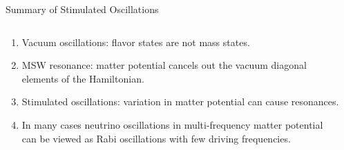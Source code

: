 \documentclass[9pt]{beamer}
\begin{document}
\begin{darkframes}
\begin{frame}{Summary of Stimulated Oscillations}


\begin{columns}[T]
\begin{column}{0.6\textwidth}

\begin{enumerate}[<+->]
\item
Vacuum oscillations: flavor states are not mass states.
\item
MSW resonance: matter potential cancels out the vacuum diagonal elements of the Hamiltonian.
\item
Stimulated oscillations: variation in matter potential can cause resonances.

\item
In many cases neutrino oscillations in multi-frequency matter potential can be viewed as Rabi oscillations with few driving frequencies.
\end{enumerate}

\end{column}
\begin{column}{0.4\textwidth}



\end{column}
\end{columns}
\end{frame}
\end{darkframes}
\end{document}
